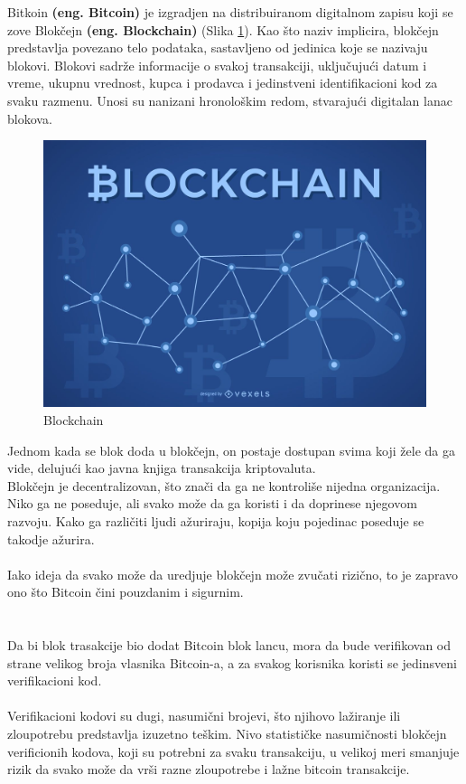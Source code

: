 \documentclass[a4paper]{article}
\begin{document}
{Bitkoin \textbf{(eng. Bitcoin)} je izgradjen na distribuiranom digitalnom zapisu koji se zove Blokčejn \textbf{(eng. Blockchain)} (Slika \ref{fig:Blockchain}). Kao što naziv implicira, blokčejn predstavlja povezano telo podataka, sastavljeno od jedinica koje se nazivaju blokovi. Blokovi sadrže informacije o svakoj transakciji, uključujući datum i vreme, ukupnu vrednost, kupca i prodavca i jedinstveni identifikacioni kod za svaku razmenu. Unosi su nanizani hronološkim redom, stvarajući digitalan lanac blokova.
\\
\begin{figure}[h!]
\begin{center}
\includegraphics[scale=0.15]{Blockchain.jpg}
\end{center}
\caption{Blockchain}
\label{fig:Blockchain}
\end{figure}

\newpage
Jednom kada se blok doda u blokčejn, on postaje dostupan svima koji žele da ga vide, delujući kao javna knjiga transakcija kriptovaluta.
\\
Blokčejn je decentralizovan, što znači da ga ne kontroliše nijedna organizacija. Niko ga ne poseduje, ali svako može da ga koristi i da doprinese njegovom razvoju. Kako ga različiti ljudi ažuriraju, kopija koju pojedinac poseduje se takodje ažurira.
\\
\\
Iako ideja da svako može da uredjuje blokčejn može zvučati rizično, to je zapravo ono što Bitcoin čini pouzdanim i sigurnim.
\\
\\
\\
Da bi blok trasakcije bio dodat Bitcoin blok lancu, mora da bude verifikovan od strane velikog broja vlasnika Bitcoin-a, a za svakog korisnika koristi se jedinsveni verifikacioni kod.
\\
\\
Verifikacioni kodovi su dugi, nasumični brojevi, što njihovo lažiranje ili zloupotrebu predstavlja izuzetno teškim. Nivo statističke nasumičnosti blokčejn verificionih kodova, koji su potrebni za svaku transakciju, u velikoj meri smanjuje rizik da svako može da vrši razne zloupotrebe i lažne bitcoin transakcije.


}
\end{document}
